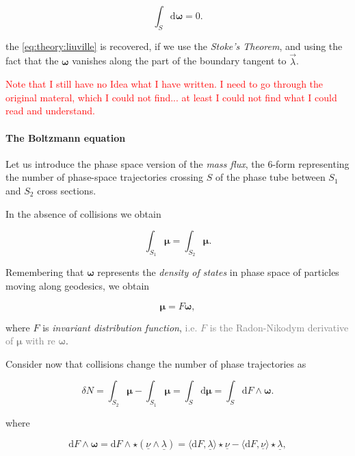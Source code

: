 \begin{equation}
\int_S\text{d}\boldsymbol{\omega} = 0.
\end{equation}

the \ref{eq:theory:liuville} is recovered, if we use the \textit{Stoke’s Theorem}, and using the fact that the $\boldsymbol{\omega}$ vanishes along the part of the boundary tangent to $\vec{\lambda}$.

\textcolor{red}{Note that I still have no Idea what I have written. I need to go through the original materal, which I could not find... at least I could not find what I could read and understand. }


\paragraph{The Boltzmann equation}


Let us introduce the phase space version of the \textit{mass flux}, the 6-form representing the number of phase-space trajectories crossing $S$ of the phase tube between $S_1$ and $S_2$ cross sections. 

In the absence of collisions we obtain 

\begin{equation}
    \int_{S_1}\boldsymbol{\mu} = \int_{S_2}\boldsymbol{\mu}.
\end{equation}

Remembering that $\boldsymbol{\omega}$ represents the \textit{density of states} in phase space of particles moving along geodesics, we obtain 

\begin{equation}
    \boldsymbol{\mu} = F\boldsymbol{\omega},
\end{equation}

where $F$ is \textit{invariant distribution function}, \textcolor{gray}{i.e. $F$ is the Radon-Nikodym derivative of $\boldsymbol{\mu}$ with re $\boldsymbol{\omega}$}.

Consider now that collisions change the number of phase trajectories as 

\begin{equation}
    \delta N = \int_{S_2} \boldsymbol{\mu} - \int_{S_1}\boldsymbol{\mu} = \int_S \text{d}\boldsymbol{\mu} = \int_S \text{d}F\wedge\boldsymbol{\omega}.
\end{equation}

where 

\begin{equation}
    \text{d}F\wedge\boldsymbol{\omega} = \text{d}F\wedge\star (\underline{\nu}\wedge\underline{\lambda}) = \langle\text{d}F,\underline{\lambda}\rangle\star\underline{\nu} - \langle\text{d}F,\underline{\nu}\rangle\star\underline{\lambda},
\end{equation}


